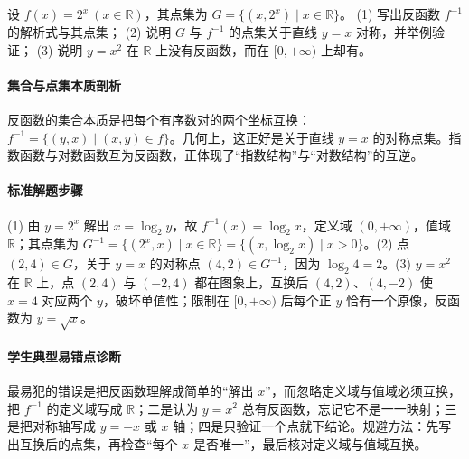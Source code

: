 \begin{problem}
设 $f(x)=2^x\ (x\in\mathbb{R})$，其点集为 $G=\{(x,2^x)\mid x\in\mathbb{R}\}$。
(1) 写出反函数 $f^{-1}$ 的解析式与其点集；
(2) 说明 $G$ 与 $f^{-1}$ 的点集关于直线 $y=x$ 对称，并举例验证；
(3) 说明 $y=x^2$ 在 $\mathbb{R}$ 上没有反函数，而在 $[0,+\infty)$ 上却有。
\end{problem}
\begin{solution}
\paragraph{集合与点集本质剖析}
反函数的集合本质是把每个有序数对的两个坐标互换：$f^{-1}=\{(y,x)\mid (x,y)\in f\}$。几何上，这正好是关于直线 $y=x$ 的对称点集。指数函数与对数函数互为反函数，正体现了“指数结构”与“对数结构”的互逆。
\paragraph{标准解题步骤}
(1) 由 $y=2^x$ 解出 $x=\log_2 y$，故 $f^{-1}(x)=\log_2 x$，定义域 $(0,+\infty)$，值域 $\mathbb{R}$；其点集为 $G^{-1}=\{(2^x,x)\mid x\in\mathbb{R}\}=\{(x,\log_2 x)\mid x>0\}$。(2) 点 $(2,4)\in G$，关于 $y=x$ 的对称点 $(4,2)\in G^{-1}$，因为 $\log_2 4=2$。(3) $y=x^2$ 在 $\mathbb{R}$ 上，点 $(2,4)$ 与 $(-2,4)$ 都在图象上，互换后 $(4,2)$、$(4,-2)$ 使 $x=4$ 对应两个 $y$，破坏单值性；限制在 $[0,+\infty)$ 后每个正 $y$ 恰有一个原像，反函数为 $y=\sqrt{x}$。
\paragraph{学生典型易错点诊断}
最易犯的错误是把反函数理解成简单的“解出 $x$”，而忽略定义域与值域必须互换，把 $f^{-1}$ 的定义域写成 $\mathbb{R}$；二是认为 $y=x^2$ 总有反函数，忘记它不是一一映射；三是把对称轴写成 $y=-x$ 或 $x$ 轴；四是只验证一个点就下结论。规避方法：先写出互换后的点集，再检查“每个 $x$ 是否唯一”，最后核对定义域与值域互换。
\end{solution}

